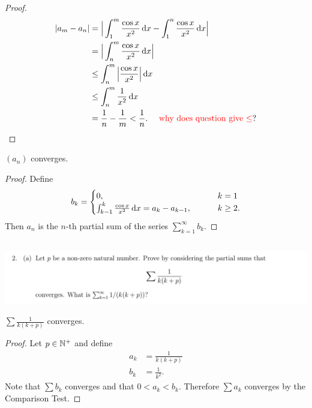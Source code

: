 \documentclass[12pt]{article}
\begin{document}
\begin{proof}
  \begin{align*}
    |a_m - a_n| &=    \Big| \int_1^m \frac{\cos x}{x^2} \dx - \int_1^n \frac{\cos x}{x^2} \dx \Big|\\
                &=    \Big| \int_n^m \frac{\cos x}{x^2} \dx \Big|\\
                &\leq \int_n^m \Big| \frac{\cos x}{x^2} \Big| \dx \\
                &\leq \int_n^m \frac{1}{x^2} \dx \\
                &= \frac{1}{n} - \frac{1}{m}
                < \frac{1}{n}. ~~~~\text{\red{why does question give $\leq$}?}
  \end{align*}
\end{proof}
\begin{claim*}
  $(a_n)$ converges.
\end{claim*}
\begin{proof}
  Define
  \begin{align*}
    b_k =
    \begin{cases}
      0,     ~~~~~~~~~~~~~~&k = 1\\
      \int_{k-1}^k \frac{\cos x}{x^2} \dx = a_{k} - a_{k-1},   ~~~~~~~&k \geq 2.
    \end{cases}
  \end{align*}
  Then $a_n$ is the $n$-th partial sum of the series $\sum_{k=1}^\infty b_k$.

\end{proof}

\newpage
\subsection{}
\begin{mdframed}
\includegraphics[width=400pt]{img/analysis--oxford-M2-I-5-2-a.png}
\end{mdframed}

\begin{claim*}
  $\sum \frac{1}{k(k+p)}$ converges.
\end{claim*}

\begin{proof}
  Let $p \in \mathbb{N}^+$ and define
  \begin{align*}
    a_k &= \frac{1}{k(k + p)}\\
    b_k &= \frac{1}{k^2}.
  \end{align*}
  Note that $\sum b_k$ converges and that $0 < a_k < b_k$. Therefore $\sum a_k$ converges by the
  Comparison Test. 
\end{proof}
\end{document}
